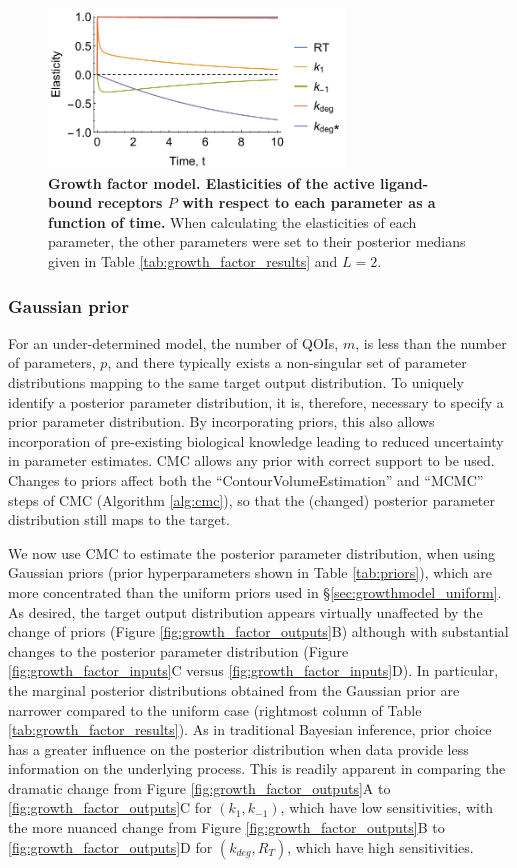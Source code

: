 \begin{figure}[H]
	\centerline{\includegraphics[width=0.7\textwidth]{../figures/dixit_elasticities.pdf}}
	\caption{\textbf{Growth factor model. Elasticities of the active ligand-bound receptors $P$ with respect to each parameter as a function of time.} When calculating the elasticities of each parameter, the other parameters were set to their posterior medians given in Table \ref{tab:growth_factor_results} and $L=2$.}
	\label{fig:dixit_elasticities}
\end{figure}

\subsubsection{Gaussian prior}
For an under-determined model, the number of QOIs, $m$, is less than the number of parameters, $p$, and there typically exists a non-singular set of parameter distributions mapping to the same target output distribution. To uniquely identify a posterior parameter distribution, it is, therefore, necessary to specify a prior parameter distribution. By incorporating priors, this also allows incorporation of pre-existing biological knowledge leading to reduced uncertainty in parameter estimates. CMC allows any prior with correct support to be used. Changes to priors affect both the ``ContourVolumeEstimation'' and ``MCMC'' steps of CMC (Algorithm \ref{alg:cmc}), so that the (changed) posterior parameter distribution still maps to the target.

We now use CMC to estimate the posterior parameter distribution, when using Gaussian priors (prior hyperparameters shown in Table \ref{tab:priors}), which are more concentrated than the uniform priors used in \S\ref{sec:growthmodel_uniform}. As desired, the target output distribution appears virtually unaffected by the change of priors (Figure \ref{fig:growth_factor_outputs}B) although with substantial changes to the posterior parameter distribution (Figure \ref{fig:growth_factor_inputs}C versus \ref{fig:growth_factor_inputs}D). In particular, the marginal posterior distributions obtained from the Gaussian prior are narrower compared to the uniform case (rightmost column of Table \ref{tab:growth_factor_results}). As in traditional Bayesian inference, prior choice has a greater influence on the posterior distribution when data provide less information on the underlying process. This is readily apparent in comparing the dramatic change from Figure \ref{fig:growth_factor_outputs}A to \ref{fig:growth_factor_outputs}C for $(k_1,k_{-1})$, which have low sensitivities, with the more nuanced change from Figure \ref{fig:growth_factor_outputs}B to \ref{fig:growth_factor_outputs}D for $(k_{deg},R_T)$, which have high sensitivities.

